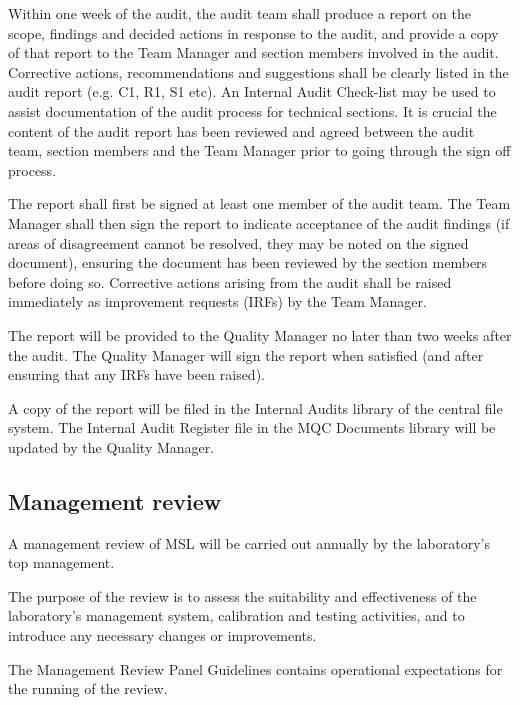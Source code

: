 Within one week of the audit, the audit team shall produce a report on the scope, findings and decided actions in response to the audit, and provide a copy of that report to the Team Manager and section members involved in the audit.  Corrective actions, recommendations and suggestions shall be clearly listed in the audit report (e.g. C1, R1, S1 etc). An Internal Audit Check-list may be used to assist documentation of the audit process for technical sections. It is crucial the content of the audit report has been reviewed and agreed between the audit team, section members and the Team Manager prior to going through the sign off process.

The report shall first be signed at least one member of the audit team.  The Team Manager shall then sign the report to indicate acceptance of the audit findings (if areas of disagreement cannot be resolved, they may be noted on the signed document), ensuring the document has been reviewed by the section members before doing so. Corrective actions arising from the audit shall be raised immediately as improvement requests (IRFs) by the Team Manager.

The report will be provided to the Quality Manager no later than two weeks after the audit. The Quality Manager will sign the report when satisfied (and after ensuring that any IRFs have been raised). 

A copy of the report will be filed in the Internal Audits library of the central file system. The Internal Audit Register file in the MQC Documents library will be updated by the Quality Manager.

\subsection{Management review}
\label{ss:management_review}
A management review of MSL will be carried out annually by the laboratory’s top management. 

The purpose of the review is to assess the suitability and effectiveness of the laboratory's management system, calibration and testing activities, and to introduce any necessary changes or improvements.  

The Management Review Panel Guidelines \cite{MSL_Management_Review_Guidelines} contains operational expectations for the running of the review.

